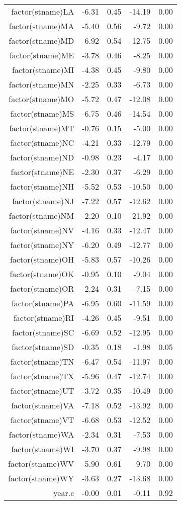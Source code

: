 \begin{table}[ht]
\begin{tabular}{rrrrr}
  factor(stname)LA & -6.31 & 0.45 & -14.19 & 0.00 \\ 
  factor(stname)MA & -5.40 & 0.56 & -9.72 & 0.00 \\ 
  factor(stname)MD & -6.92 & 0.54 & -12.75 & 0.00 \\ 
  factor(stname)ME & -3.78 & 0.46 & -8.25 & 0.00 \\ 
  factor(stname)MI & -4.38 & 0.45 & -9.80 & 0.00 \\ 
  factor(stname)MN & -2.25 & 0.33 & -6.73 & 0.00 \\ 
  factor(stname)MO & -5.72 & 0.47 & -12.08 & 0.00 \\ 
  factor(stname)MS & -6.75 & 0.46 & -14.54 & 0.00 \\ 
  factor(stname)MT & -0.76 & 0.15 & -5.00 & 0.00 \\ 
  factor(stname)NC & -4.21 & 0.33 & -12.79 & 0.00 \\ 
  factor(stname)ND & -0.98 & 0.23 & -4.17 & 0.00 \\ 
  factor(stname)NE & -2.30 & 0.37 & -6.29 & 0.00 \\ 
  factor(stname)NH & -5.52 & 0.53 & -10.50 & 0.00 \\ 
  factor(stname)NJ & -7.22 & 0.57 & -12.62 & 0.00 \\ 
  factor(stname)NM & -2.20 & 0.10 & -21.92 & 0.00 \\ 
  factor(stname)NV & -4.16 & 0.33 & -12.47 & 0.00 \\ 
  factor(stname)NY & -6.20 & 0.49 & -12.77 & 0.00 \\ 
  factor(stname)OH & -5.83 & 0.57 & -10.26 & 0.00 \\ 
  factor(stname)OK & -0.95 & 0.10 & -9.04 & 0.00 \\ 
  factor(stname)OR & -2.24 & 0.31 & -7.15 & 0.00 \\ 
  factor(stname)PA & -6.95 & 0.60 & -11.59 & 0.00 \\ 
  factor(stname)RI & -4.26 & 0.45 & -9.51 & 0.00 \\ 
  factor(stname)SC & -6.69 & 0.52 & -12.95 & 0.00 \\ 
  factor(stname)SD & -0.35 & 0.18 & -1.98 & 0.05 \\ 
  factor(stname)TN & -6.47 & 0.54 & -11.97 & 0.00 \\ 
  factor(stname)TX & -5.96 & 0.47 & -12.74 & 0.00 \\ 
  factor(stname)UT & -3.72 & 0.35 & -10.49 & 0.00 \\ 
  factor(stname)VA & -7.18 & 0.52 & -13.92 & 0.00 \\ 
  factor(stname)VT & -6.68 & 0.53 & -12.52 & 0.00 \\ 
  factor(stname)WA & -2.34 & 0.31 & -7.53 & 0.00 \\ 
  factor(stname)WI & -3.70 & 0.37 & -9.98 & 0.00 \\ 
  factor(stname)WV & -5.90 & 0.61 & -9.70 & 0.00 \\ 
  factor(stname)WY & -3.63 & 0.27 & -13.68 & 0.00 \\ 
  year.c & -0.00 & 0.01 & -0.11 & 0.92 \\ 
   \hline
\end{tabular}
\end{table}
